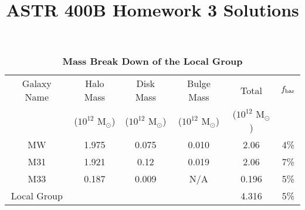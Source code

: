 \documentclass[12pt]{article}
\title{ASTR 400B Homework 3 Solutions}
\date{}
\begin{document}
\maketitle


\begin{table}[h]
\centering
\caption{ {\bf Mass Break Down of the Local Group} }
\label{table:Masses}
\begin{tabular}{ |c|c|c|c|c|c| }
\hline\hline
Galaxy Name &  Halo Mass & Disk Mass & Bulge Mass & Total & $f_{\rm bar}$\\   
	    &  ($10^{12}$ M$_\odot$)   & ($10^{12}$ M$_\odot$)  & ($10^{12}$ M$_\odot$) & ($10^{12}$ M$_\odot$) &  \\
\hline
MW  &  1.975  &  0.075 & 0.010 & 2.06  & 4\% \\
M31 &  1.921 & 0.12 & 0.019 & 2.06 & 7\% \\
M33 &  0.187  &  0.009  &  N/A & 0.196 &  5\% \\
\hline
Local Group &  &  &  &  4.316  &   5\% \\
\hline\hline
\end{tabular}
\end{table}
\end{document}

